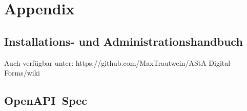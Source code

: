 \chapter{Appendix}\label{ch:appendix}

\section{Installations- und Administrationshandbuch}\label{sec:installations--und-administrationshandbuch}
Auch verfügbar unter: https://github.com/MaxTrautwein/AStA-Digital-Forms/wiki


\section{OpenAPI~Spec}\label{sec:openapi-spec}




